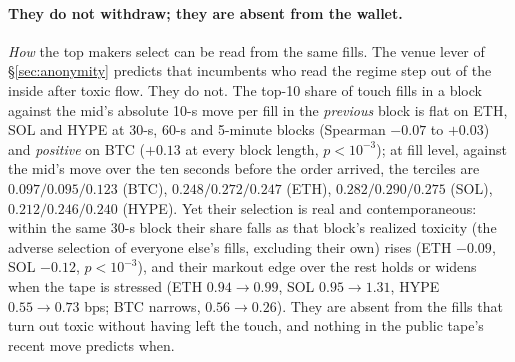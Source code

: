 \documentclass[11pt]{article}
\begin{document}
\paragraph{They do not withdraw; they are absent from the wallet.} \emph{How} the top makers select can be read from the same fills. The venue lever of \S\ref{sec:anonymity} predicts that incumbents who read the regime step out of the inside after toxic flow. They do not. The top-10 share of touch fills in a block against the mid's absolute 10-s move per fill in the \emph{previous} block is flat on ETH, SOL and HYPE at 30-s, 60-s and 5-minute blocks (Spearman $-0.07$ to $+0.03$) and \emph{positive} on BTC ($+0.13$ at every block length, $p<10^{-3}$); at fill level, against the mid's move over the ten seconds before the order arrived, the terciles are $0.097/0.095/0.123$ (BTC), $0.248/0.272/0.247$ (ETH), $0.282/0.290/0.275$ (SOL), $0.212/0.246/0.240$ (HYPE). Yet their selection is real and contemporaneous: within the same 30-s block their share falls as that block's realized toxicity (the adverse selection of everyone else's fills, excluding their own) rises (ETH $-0.09$, SOL $-0.12$, $p<10^{-3}$), and their markout edge over the rest holds or widens when the tape is stressed (ETH $0.94\to0.99$, SOL $0.95\to1.31$, HYPE $0.55\to0.73$ bps; BTC narrows, $0.56\to0.26$). They are absent from the fills that turn out toxic without having left the touch, and nothing in the public tape's recent move predicts when.
\end{document}
